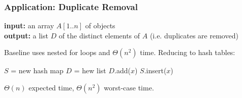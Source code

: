 \documentclass[10pt]{beamer}
\begin{document}
\begin{frame} \frametitle{Application: Duplicate Removal}
  \textbf{input:} an array $A[1..n]$ of objects\\
  \textbf{output:} a list $D$ of the distinct elements of $A$ (i.e. duplicates
    are removed)\\
    \vspace{.3cm}

  Baseline uses nested for loops and $\Theta(n^2)$ time. Reducing to hash tables:
  \vspace{.3cm}

  {\footnotesize
  \begin{algorithmic}[1]
    \State $S$ = new hash map
    \State $D$ = hew list
        \State $D$.add($x$)
        \State $S$.insert($x$)
      \EndIf
    \EndFor
    \State {}
    \EndFunction
  \end{algorithmic}
  }
  \vspace{.3cm}
  $\Theta(n)$ expected time, $\Theta(n^2)$ worst-case time.
\end{frame}
\end{document}
